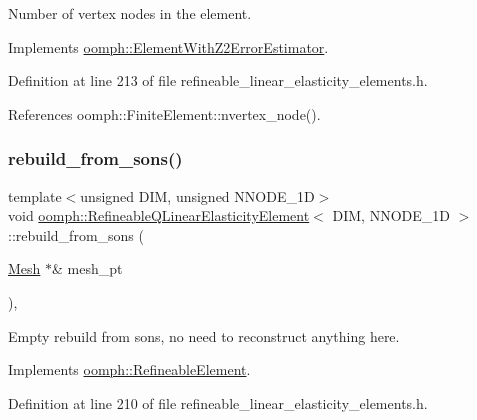 Number of vertex nodes in the element. 



Implements \hyperlink{classoomph_1_1ElementWithZ2ErrorEstimator_a19495a0e77ef4ff35f15fdf7913b4077}{oomph\+::\+Element\+With\+Z2\+Error\+Estimator}.



Definition at line 213 of file refineable\+\_\+linear\+\_\+elasticity\+\_\+elements.\+h.



References oomph\+::\+Finite\+Element\+::nvertex\+\_\+node().

\mbox{\label{classoomph_1_1RefineableQLinearElasticityElement_a700c92182b25ecdda8c4454efd347c58}} 
\subsubsection{\texorpdfstring{rebuild\+\_\+from\+\_\+sons()}{rebuild\_from\_sons()}}
{\footnotesize\ttfamily template$<$unsigned D\+IM, unsigned N\+N\+O\+D\+E\+\_\+1D$>$ \\
void \hyperlink{classoomph_1_1RefineableQLinearElasticityElement}{oomph\+::\+Refineable\+Q\+Linear\+Elasticity\+Element}$<$ D\+IM, N\+N\+O\+D\+E\+\_\+1D $>$\+::rebuild\+\_\+from\+\_\+sons (\begin{DoxyParamCaption}\item[{\hyperlink{classoomph_1_1Mesh}{Mesh} $\ast$\&}]{mesh\+\_\+pt }\end{DoxyParamCaption})\hspace{0.3cm}{\ttfamily [inline]}, {\ttfamily [virtual]}}



Empty rebuild from sons, no need to reconstruct anything here. 



Implements \hyperlink{classoomph_1_1RefineableElement_a33324be27833fa4b78279d17158215fa}{oomph\+::\+Refineable\+Element}.



Definition at line 210 of file refineable\+\_\+linear\+\_\+elasticity\+\_\+elements.\+h.

